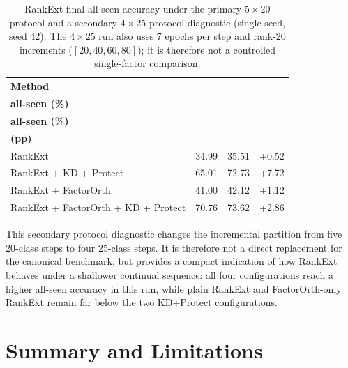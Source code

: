 \begin{table}[htbp]
\centering
\begin{tabularx}{\textwidth}{@{}X r r r@{}}
\toprule
\textbf{Method} & \shortstack[r]{\textbf{$5\times20$}\\\textbf{all-seen (\%)}} & \shortstack[r]{\textbf{$4\times25$}\\\textbf{all-seen (\%)}} & \shortstack[r]{\textbf{$\Delta$ ($4\times25-5\times20$)}\\\textbf{(pp)}} \\
\midrule
RankExt & 34.99 & 35.51 & +0.52 \\
RankExt + KD + Protect & 65.01 & 72.73 & +7.72 \\
RankExt + FactorOrth & 41.00 & 42.12 & +1.12 \\
RankExt + FactorOrth + KD + Protect & 70.76 & 73.62 & +2.86 \\
\bottomrule
\end{tabularx}
\caption[RankExt $4\times25$ protocol diagnostic]{RankExt final all-seen
accuracy under the primary $5\times20$ protocol and a secondary $4\times25$
protocol diagnostic (single seed, seed 42). The $4\times25$ run also uses
7 epochs per step and rank-20 increments ($[20,40,60,80]$); it is therefore
not a controlled single-factor comparison.}
\label{tab:ch5-protocol-diag}
\end{table}

This secondary protocol diagnostic changes the incremental partition from
five 20-class steps to four 25-class steps. It is therefore not a direct
replacement for the canonical benchmark, but provides a compact indication
of how RankExt behaves under a shallower continual sequence: all four
configurations reach a higher all-seen accuracy in this run, while plain
RankExt and FactorOrth-only RankExt remain far below the two KD+Protect
configurations.

\section{Summary and Limitations}
\label{sec:ch5-summary}

